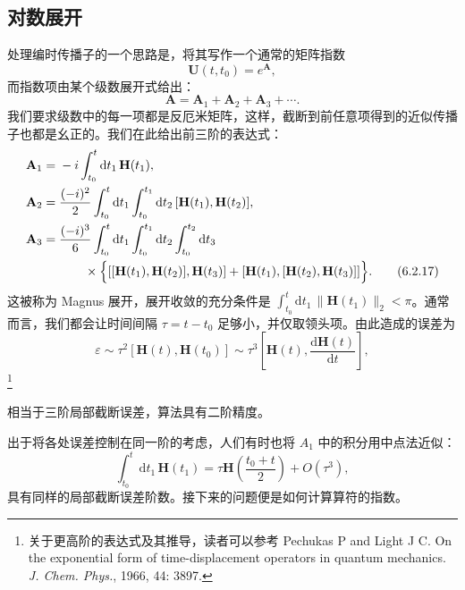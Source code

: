 \subsection{对数展开}

处理编时传播子的一个思路是，将其写作一个通常的矩阵指数
\begin{equation}
 \mathbf U(t,t_0)=e^{\mathbf A},
\tag{6.2.15}
\end{equation}
而指数项由某个级数展开式给出：
\begin{equation}
 \mathbf A=\mathbf A_1+\mathbf A_2+\mathbf A_3+\cdots.
\tag{6.2.16}
\end{equation}
我们要求级数中的每一项都是反厄米矩阵，这样，截断到前任意项得到的近似传播子也都是幺正的。我们在此给出前三阶的表达式：
\begin{align}
 \mathbf A_1={}&-i\int_{t_0}^t\mathrm dt_1\,\mathbf H(t_1),\notag\\
 \mathbf A_2={}&\frac{(-i)^2}{2}\int_{t_0}^t\mathrm dt_1\int_{t_0}^{t_1}\mathrm dt_2\,[\mathbf H(t_1),\mathbf H(t_2)],\notag\\
 \mathbf A_3={}&\frac{(-i)^3}{6}\int_{t_0}^t\mathrm dt_1\int_{t_0}^{t_1}\mathrm dt_2\int_{t_0}^{t_2}\mathrm dt_3\\
 &\qquad\times\Bigl\{[[\mathbf H(t_1),\mathbf H(t_2)],\mathbf H(t_3)]+[\mathbf H(t_1),[\mathbf H(t_2),\mathbf H(t_3)]]\Bigr\}.
\tag{6.2.17}
\end{align}
这被称为 Magnus 展开，展开收敛的充分条件是 $\int_{t_0}^t\mathrm dt_1\,\|\mathbf H(t_1)\|_2<\pi$。通常而言，我们都会让时间间隔 $\tau=t-t_0$ 足够小，并仅取领头项。由此造成的误差为
\begin{equation}
 \varepsilon\sim\tau^2[\mathbf H(t),\mathbf H(t_0)]\sim\tau^3\left[\mathbf H(t),\frac{\mathrm d\mathbf H(t)}{\mathrm dt}\right],
\tag{6.2.18}
\end{equation}
\footnote{关于更高阶的表达式及其推导，读者可以参考 Pechukas P and Light J C. On the exponential form of time-displacement operators in quantum mechanics. \emph{J. Chem. Phys.}, 1966, 44: 3897.}

相当于三阶局部截断误差，算法具有二阶精度。

出于将各处误差控制在同一阶的考虑，人们有时也将 $A_1$ 中的积分用中点法近似：
\begin{equation}
 \int_{t_0}^{t}\mathrm dt_1\,\mathbf H(t_1)=\tau\mathbf H\left(\frac{t_0+t}{2}\right)+O(\tau^3),
\tag{6.2.19}
\end{equation}
具有同样的局部截断误差阶数。接下来的问题便是如何计算算符的指数。

